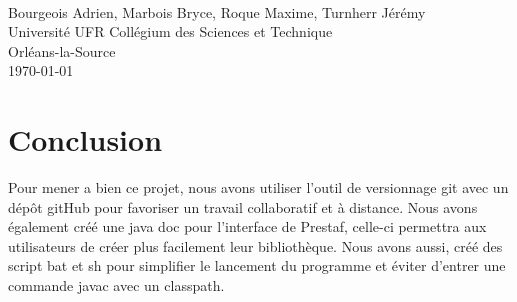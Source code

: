 \documentclass[12pt]{article}%
\begin{document}
\pagestyle{empty}

\begin{titlepage}
\begin{center}
\\
\vspace{0.5cm}
\vspace{2cm}
{\Large Bourgeois Adrien, Marbois Bryce, Roque Maxime, Turnherr Jérémy
\\Université UFR Collégium des Sciences et Technique
\\Orléans-la-Source}\\
\vfill
{\large\today}
\end{center}
\end{titlepage}

\clearpage

\tableofcontents

\cleardoublepage

\pagestyle{fancy}

























\section{Conclusion}

Pour mener a bien ce projet, nous avons utiliser l'outil de versionnage git avec un dépôt gitHub pour favoriser un travail collaboratif et à distance. Nous avons également créé une java doc pour l'interface de Prestaf, celle-ci permettra aux utilisateurs de créer plus facilement leur bibliothèque. Nous avons aussi, créé des script bat et sh pour simplifier le lancement du programme et éviter d'entrer une commande javac avec un classpath.
	
\end{document}
